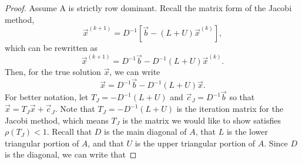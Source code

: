 \documentclass[12pt,letterpaper]{article}
\theoremstyle{definition}
\begin{document}
\begin{proof}
Assume A is strictly row dominant. Recall the matrix form of the Jacobi method, $$\vec{x}^{(k+1)}=D^{-1}\left[\vec{b}-(L+U)\vec{x}^{(k)}\right],$$ which can be rewritten as $$\vec{x}^{(k+1)} = D^{-1}\vec{b} - D^{-1}(L + U)\vec{x}^{(k)}.$$ Then, for the true solution $\vec{x}$, we can write $$\vec{x} = D^{-1}\vec{b} - D^{-1}(L + U)\vec{x}.$$ For better notation, let $T_{J} = -D^{-1}(L + U)$ and $\vec{c}_{J} = D^{-1}\vec{b}$ so that $\vec{x} = T_{J}\vec{x} + \vec{c}_J$. %
Note that $T_J = -D^{-1}(L + U)$ is the iteration matrix for the Jacobi method, which means $T_J$ is the matrix we would like to show satisfies $\rho(T_J) < 1$. Recall that $D$ is the main diagonal of $A$, that $L$ is the lower triangular portion of $A$, and that $U$ is the upper triangular portion of $A$. Since $D$ is the diagonal, we can write that %

    


\end{proof}
\end{document}
